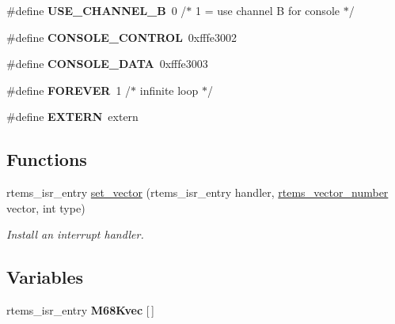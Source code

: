 \begin{DoxyCompactItemize}
\#define {\bfseries U\+S\+E\+\_\+\+C\+H\+A\+N\+N\+E\+L\+\_\+B}~0                /$\ast$ 1 = use channel B for console $\ast$/
\item 
\mbox{\label{group__RTEMSBSPsM68kMVME147s_ga35de1b31d83ed28bc0050d3114543aab}} 
\#define {\bfseries C\+O\+N\+S\+O\+L\+E\+\_\+\+C\+O\+N\+T\+R\+OL}~0xfffe3002
\item 
\mbox{\label{group__RTEMSBSPsM68kMVME147s_gaa81c81c37b7889031099b9ff7d3c0a60}} 
\#define {\bfseries C\+O\+N\+S\+O\+L\+E\+\_\+\+D\+A\+TA}~0xfffe3003
\item 
\mbox{\label{group__RTEMSBSPsM68kMVME147s_ga75c828ed6c02fcd44084e67a032e422c}} 
\#define {\bfseries F\+O\+R\+E\+V\+ER}~1                  /$\ast$ infinite loop $\ast$/
\item 
\mbox{\label{group__RTEMSBSPsM68kMVME147s_ga77366c1bd428629dc898e188bfd182a3}} 
\#define {\bfseries E\+X\+T\+E\+RN}~extern
\end{DoxyCompactItemize}
\subsection*{Functions}
\begin{DoxyCompactItemize}
\item 
rtems\+\_\+isr\+\_\+entry \mbox{\hyperlink{group__RTEMSBSPsM68kMVME147s_gab3388042c56b34c40be81fd5f028d97e}{set\+\_\+vector}} (rtems\+\_\+isr\+\_\+entry handler, \mbox{\hyperlink{group__ClassicINTR_ga3e434c197d99f128e78cae4d9358bd8b}{rtems\+\_\+vector\+\_\+number}} vector, int type)
\begin{DoxyCompactList}\small\item\em Install an interrupt handler. \end{DoxyCompactList}\end{DoxyCompactItemize}
\subsection*{Variables}
\begin{DoxyCompactItemize}
\item 
\mbox{\label{group__RTEMSBSPsM68kMVME147s_ga744e8a50e2dcbb8fb7e6b0c7554008f9}} 
rtems\+\_\+isr\+\_\+entry {\bfseries M68\+Kvec} \mbox{[}$\,$\mbox{]}
\end{DoxyCompactItemize}


